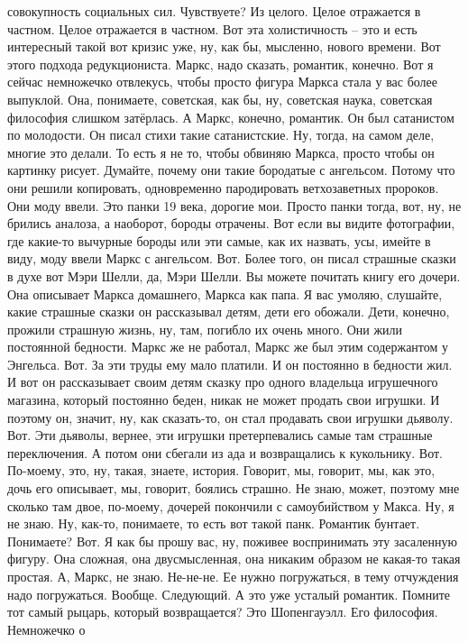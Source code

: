 совокупность социальных сил. Чувствуете? Из целого. Целое отражается в частном.
Целое отражается в частном. Вот эта холистичность – это и есть интересный такой
вот кризис уже, ну, как бы, мысленно, нового времени. Вот этого подхода
редукциониста. Маркс, надо сказать, романтик, конечно. Вот я сейчас немножечко
отвлекусь, чтобы просто фигура Маркса стала у вас более выпуклой. Она,
понимаете, советская, как бы, ну, советская наука, советская философия слишком
затёрлась. А Маркс, конечно, романтик. Он был сатанистом по молодости. Он писал
стихи такие сатанистские. Ну, тогда, на самом деле, многие это делали. То есть я
не то, чтобы обвиняю Маркса, просто чтобы он картинку рисует. Думайте, почему
они такие бородатые с ангельсом. Потому что они решили копировать, одновременно
пародировать ветхозаветных пророков. Они моду ввели. Это панки 19 века, дорогие
мои. Просто панки тогда, вот, ну, не брились аналоза, а наоборот, бороды
отрачены. Вот если вы видите фотографии, где какие-то вычурные бороды или эти
самые, как их назвать, усы, имейте в виду, моду ввели Маркс с ангельсом. Вот.
Более того, он писал страшные сказки в духе вот Мэри Шелли, да, Мэри Шелли. Вы
можете почитать книгу его дочери. Она описывает Маркса домашнего, Маркса как
папа. Я вас умоляю, слушайте, какие страшные сказки он рассказывал детям, дети
его обожали. Дети, конечно, прожили страшную жизнь, ну, там, погибло их очень
много. Они жили постоянной бедности. Маркс же не работал, Маркс же был этим
содержантом у Энгельса. Вот. За эти труды ему мало платили. И он постоянно в
бедности жил. И вот он рассказывает своим детям сказку про одного владельца
игрушечного магазина, который постоянно беден, никак не может продать свои
игрушки. И поэтому он, значит, ну, как сказать-то, он стал продавать свои
игрушки дьяволу. Вот. Эти дьяволы, вернее, эти игрушки претерпевались самые там
страшные переключения. А потом они сбегали из ада и возвращались к кукольнику.
Вот. По-моему, это, ну, такая, знаете, история. Говорит, мы, говорит, мы, как
это, дочь его описывает, мы, говорит, боялись страшно. Не знаю, может, поэтому
мне сколько там двое, по-моему, дочерей покончили с самоубийством у Макса. Ну, я
не знаю. Ну, как-то, понимаете, то есть вот такой панк. Романтик бунтает.
Понимаете? Вот. Я как бы прошу вас, ну, поживее воспринимать эту засаленную
фигуру. Она сложная, она двусмысленная, она никаким образом не какая-то такая
простая. А, Маркс, не знаю. Не-не-не. Ее нужно погружаться, в тему отчуждения
надо погружаться. Вообще. Следующий. А это уже усталый романтик. Помните тот
самый рыцарь, который возвращается? Это Шопенгауэлл. Его философия. Немножечко о
